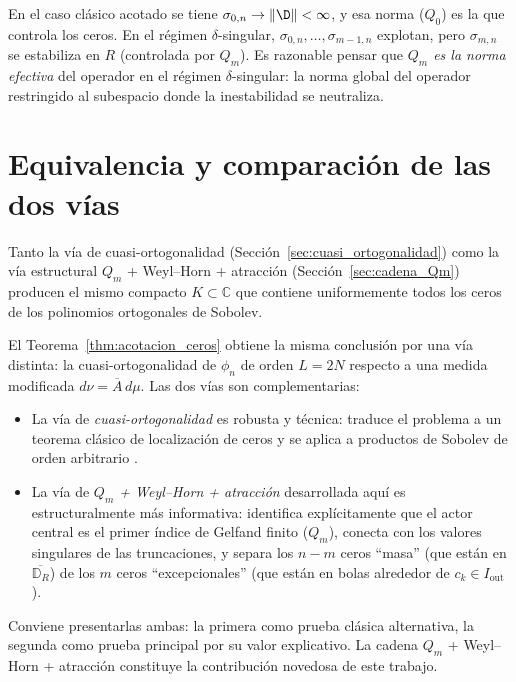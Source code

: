 \begin{rmk}\label{rem:Q_m_norma_efectiva}
	En el caso clásico acotado se tiene $\sigma_{0,n}\to\|\D\|<\infty$, y esa norma ($Q_0$) es la que controla los ceros. En el régimen $\delta$-singular, $\sigma_{0,n},\dots,\sigma_{m-1,n}$ explotan, pero $\sigma_{m,n}$ se estabiliza en $R$ (controlada por $Q_m$). Es razonable pensar que \emph{$Q_m$ es la norma efectiva} del operador en el régimen $\delta$-singular: la norma global del operador restringido al subespacio donde la inestabilidad se neutraliza.
\end{rmk}

\section{Equivalencia y comparación de las dos vías}\label{sec:equivalencia_vias}

\begin{prop}\label{prop:equivalencia_vias}
	Tanto la vía de cuasi-ortogonalidad (Sección~\ref{sec:cuasi_ortogonalidad}) como la vía estructural $Q_m$ + Weyl--Horn + atracción (Sección~\ref{sec:cadena_Qm}) producen el mismo compacto $K\subset\mathbb{C}$ que contiene uniformemente todos los ceros de los polinomios ortogonales de Sobolev.
\end{prop}

\begin{rmk}\label{rem:comparacion_vias}
	El Teorema~\ref{thm:acotacion_ceros} obtiene la misma conclusión por una vía distinta: la cuasi-ortogonalidad de $\phi_n$ de orden $L=2N$ respecto a una medida modificada $d\nu=\overline{A}\,d\mu$. Las dos vías son complementarias:
	\begin{itemize}
		\item La vía de \emph{cuasi-ortogonalidad} es robusta y técnica: traduce el problema a un teorema clásico de localización de ceros y se aplica a productos de Sobolev de orden arbitrario \cite{lopez1999zero}.
		\item La vía de \emph{$Q_m$ + Weyl--Horn + atracción} desarrollada aquí es estructuralmente más informativa: identifica explícitamente que el actor central es el primer índice de Gelfand finito ($Q_m$), conecta con los valores singulares de las truncaciones, y separa los $n-m$ ceros ``masa'' (que están en $\overline{\mathbb{D}_R}$) de los $m$ ceros ``excepcionales'' (que están en bolas alrededor de $c_k\in I_{\mathrm{out}}$).
	\end{itemize}

	Conviene presentarlas ambas: la primera como prueba clásica alternativa, la segunda como prueba principal por su valor explicativo. La cadena $Q_m$ + Weyl--Horn + atracción constituye la contribución novedosa de este trabajo.
\end{rmk}

